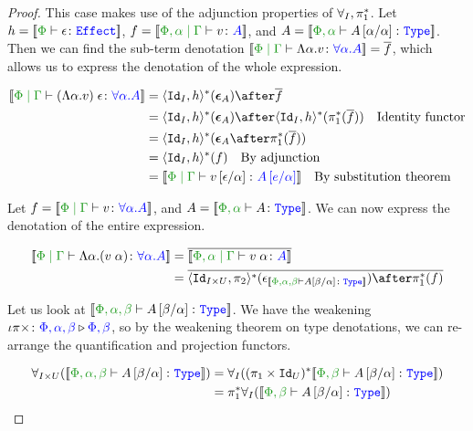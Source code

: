 \documentclass{Report}
\begin{document}
\begin{proof}
This case makes use of the adjunction properties of $\forall_I, \pi_1^*$. Let  $h = \deno{\typerelation{\P}{\e}{\effect}}$, $f = \deno{\etyperelation{\P,\a}{\G}{v}{A}}$, and $A = \deno{\typerelation{\P,\a}{A\ssub{\a}{\a}}{\type}}$. Then we can find the sub-term denotation $\deno{\gpetyperelation{\elam{\a}{v}}{\all{\a}{A}}} = \bar{f}$, which allows us to express the denotation of the whole expression.

\begin{align*}
    \deno{\gpetyperelation{\eapp{(\elam{\a}{v})}{\e}}{\all{\a}{A}}} & = \pr{\Id{I}}{h}\star(\counit{A})\after\bar{f}\\
    & = \pr{\Id{I}}{h}\star(\counit{A})\after\pr{\Id{I}}{h}\star(\pstar(\bar{f}))\qt{Identity functor}\\
    &= \pr{\Id{I}}{h}\star(\counit{A}\after\pstar(\bar{f}))\\
    &= \pr{\Id{I}}{h}\star(f)\qt{By adjunction}\\
    &= \deno{\gpetyperelation{v\ssub{\a}{\e}}{A\ssub{\a}{e}}}\qt{By substitution theorem}\\
\end{align*}

    Let $f  = \deno{\gpetyperelation{v}{\all{\a}{A}}}$, and $A  = \deno{\typerelation{\P,\a}{A}{\type}}$. We can now express the denotation of the entire expression.

    \begin{align*}
        \deno{\gpetyperelation{\elam{\a}{(\eapp{v}{\a})}}{\all{\a}{A}}} & = \bar{\deno{\etyperelation{\P,\a}{\G}{\eapp{v}{\a}}{A}}} \\
        & = \bar{\pr{\Id{I\times U}}{\pp}\star(\e_{\deno{\typerelation{\P,\a,\b}{A\ssub{\a}{\b}}{\type}}})\after\pstar(f)}
    \end{align*}

    Let us look at $\deno{\typerelation{\P,\a,\b}{A\ssub{\a}{\b}}{\type}}$. We have the weakening $\iota\pi\times \colon {\color{blue}\Phi,\alpha,\beta} \triangleright {\color {blue} \Phi,\beta}$, so by the weakening theorem on type denotations, we can re-arrange the quantification and projection functors.

    \begin{align*}
        \allIU(\deno{\typerelation{\P,\a,\b}{A\ssub{\a}{\b}}{\type}}) & = \allI( (\p\times \Id{U})\star\deno{\typerelation{\P,\b}{A\ssub{\a}{\b}}{\type}})\\ 
        & = \pstar\allI(\deno{\typerelation{\P,\b}{A\ssub{\a}{\b}}{\type}})
    \end{align*}


\end{proof}
\end{document}
